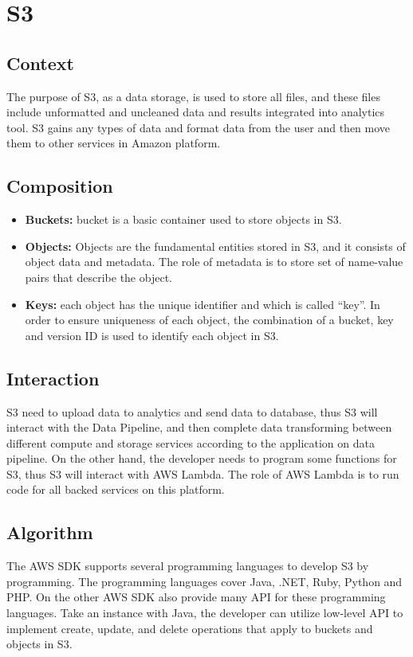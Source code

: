 \section{S3}
	\subsection{Context}
	The purpose of S3, as a data storage, is used to store all files, and these files include unformatted and uncleaned data and results integrated into analytics tool. S3 gains any types of data and format data from the user and then move them to other services in Amazon platform.
        
	\subsection{Composition}
	\begin{itemize}
		\item \textbf{Buckets:} bucket is a basic container used to store objects in S3.\cite{z1}
		\item \textbf{Objects:} Objects are the fundamental entities stored in S3, and it consists of object data and metadata. The role of metadata is to store set of name-value pairs that describe the object.\cite{z1}
		\item \textbf{Keys:} each object has the unique identifier and which is called “key”. In order to ensure uniqueness of each object, the combination of a bucket, key and version ID is used to identify each object in S3.\cite{z1}
	\end{itemize}

	\subsection{Interaction}
    S3 need to upload data to analytics and send data to database, thus S3 will interact with the Data Pipeline, and then complete data transforming between different compute and storage services according to the application on data pipeline. On the other hand, the developer needs to program some functions for S3, thus S3 will interact with AWS Lambda. The role of AWS Lambda is to run code for all backed services on this platform.
    
	\subsection{Algorithm}
    The AWS SDK supports several programming languages to develop S3 by programming. The programming languages cover Java, .NET, Ruby, Python and PHP. On the other AWS SDK also provide many API for these programming languages. Take an instance with Java, the developer can utilize low-level API to implement create, update, and delete operations that apply to buckets and objects in S3.\cite{z2} 

